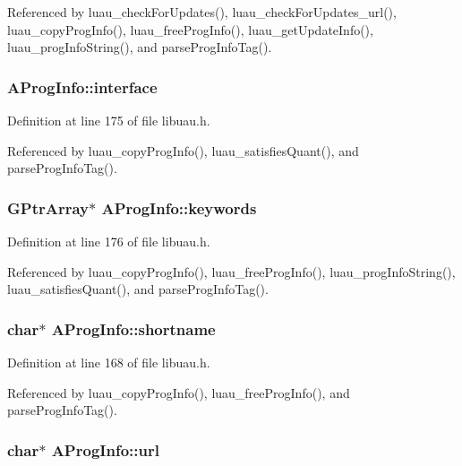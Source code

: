 Referenced by luau\_\-check\-For\-Updates(), luau\_\-check\-For\-Updates\_\-url(), luau\_\-copy\-Prog\-Info(), luau\_\-free\-Prog\-Info(), luau\_\-get\-Update\-Info(), luau\_\-prog\-Info\-String(), and parse\-Prog\-Info\-Tag().
\subsubsection{ {\bf AProg\-Info::interface}}\label{structAProgInfo_o8}




Definition at line 175 of file libuau.h.

Referenced by luau\_\-copy\-Prog\-Info(), luau\_\-satisfies\-Quant(), and parse\-Prog\-Info\-Tag().
\subsubsection{\setlength{\rightskip}{0pt plus 5cm}GPtr\-Array$\ast$ {\bf AProg\-Info::keywords}}\label{structAProgInfo_o9}




Definition at line 176 of file libuau.h.

Referenced by luau\_\-copy\-Prog\-Info(), luau\_\-free\-Prog\-Info(), luau\_\-prog\-Info\-String(), luau\_\-satisfies\-Quant(), and parse\-Prog\-Info\-Tag().
\subsubsection{\setlength{\rightskip}{0pt plus 5cm}char$\ast$ {\bf AProg\-Info::shortname}}\label{structAProgInfo_o1}




Definition at line 168 of file libuau.h.

Referenced by luau\_\-copy\-Prog\-Info(), luau\_\-free\-Prog\-Info(), and parse\-Prog\-Info\-Tag().
\subsubsection{\setlength{\rightskip}{0pt plus 5cm}char$\ast$ {\bf AProg\-Info::url}}\label{structAProgInfo_o4}




